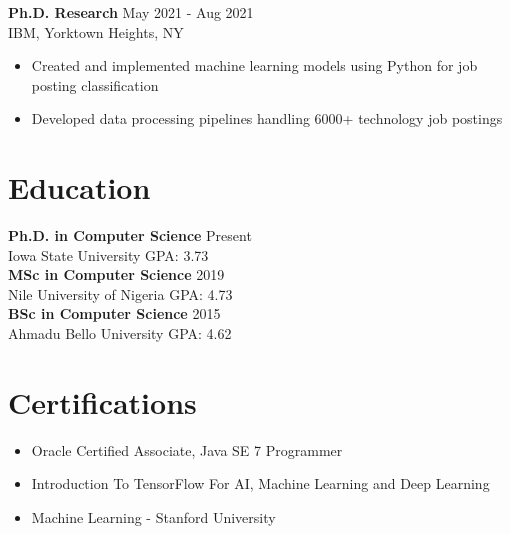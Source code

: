 \documentclass[11pt]{article}
\begin{document}
\textbf{Ph.D. Research} \hfill May 2021 - Aug 2021\\
IBM, Yorktown Heights, NY
\begin{itemize}[leftmargin=*]
    \item Created and implemented machine learning models using Python for job posting classification
    \item Developed data processing pipelines handling 6000+ technology job postings
\end{itemize}

\section{Education}
\textbf{Ph.D. in Computer Science} \hfill Present\\
Iowa State University \hfill GPA: 3.73\\[0.5em]
\textbf{MSc in Computer Science} \hfill 2019\\
Nile University of Nigeria \hfill GPA: 4.73\\[0.5em]
\textbf{BSc in Computer Science} \hfill 2015\\
Ahmadu Bello University \hfill GPA: 4.62

\section{Certifications}
\begin{itemize}[leftmargin=*]
    \item Oracle Certified Associate, Java SE 7 Programmer
    \item Introduction To TensorFlow For AI, Machine Learning and Deep Learning
    \item Machine Learning - Stanford University
\end{itemize}
\end{document}
